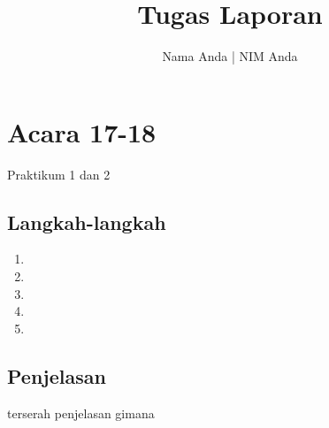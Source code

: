 \documentclass[
	12pt, %
	a4paper, %
]{fphw}
\title{Tugas Laporan} %
\author{Nama Anda | NIM Anda} %
\institute{Politeknik Negeri Jember} %
\begin{document}
\maketitle %



\section*{Acara 17-18}

\begin{problem}
  \begin{center}
  Praktikum 1 dan 2
  \end{center}
\end{problem}
\begin{center}
\end{center}


\subsection*{Langkah-langkah}

\begin{enumerate}
  \item 
  \item 
  \item 
  \item
  \item 
\end{enumerate}

\subsection*{Penjelasan}
terserah penjelasan gimana

\newpage
\end{document}
